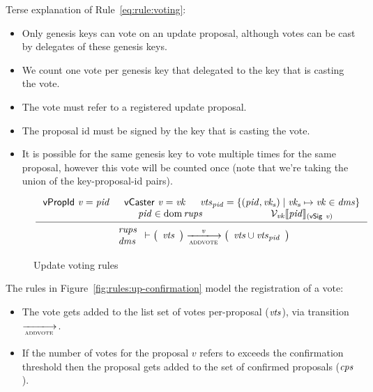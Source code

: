 Terse explanation of Rule~\ref{eq:rule:voting}:
\begin{itemize}
\item Only genesis keys can vote on an update proposal, although votes can be
  cast by delegates of these genesis keys.
\item We count one vote per genesis key that delegated to the key that is
  casting the vote.
\item The vote must refer to a registered update proposal.
\item The proposal id must be signed by the key that is casting the vote.
\item It is possible for the same genesis key to vote multiple times for
  the same proposal, however this vote will be counted once (note that we're
  taking the union of the key-proposal-id pairs).
\end{itemize}

\begin{figure}[htb]
  \begin{equation}
    \label{eq:rule:voting}
    \inference
    {
      \vPropId{v} = \var{pid} &  \vCaster{v} = \var{vk} &
      \var{vts}_{\var{pid}} =
      \{ (\var{pid}, \var{vk_s}) \mid \var{vk_s} \mapsto \var{vk} \in \var{dms} \}\\
      & \var{pid} \in \dom \var{rups} &
      \mathcal{V}_{\var{vk}}\serialised{\var{pid}}_{(\vSig{v})}\\
    }
    {
      {
        \begin{array}{l}
          \var{rups}\\
          \var{dms}
        \end{array}
      }
      \vdash
      {
        \left(
          \begin{array}{l}
            \var{vts}
          \end{array}
        \right)
      }
      \trans{addvote}{\var{v}}
      {
        \left(
          \begin{array}{l}
            \var{vts} \cup \var{vts}_{\var{pid}}\\
          \end{array}
        \right)
      }
    }
  \end{equation}
  \caption{Update voting rules}
  \label{fig:rules:voting}
\end{figure}

\clearpage

The rules in Figure~\ref{fig:rules:up-confirmation} model the registration of a vote:
\begin{itemize}
\item The vote gets added to the list set of votes per-proposal ($\mathit{vts}$),
  via transition $\trans{addvote}{}$.
\item If the number of votes for the proposal $v$ refers to exceeds the
  confirmation threshold then the proposal gets added to the set of confirmed
  proposals ($\mathit{cps}$).
\end{itemize}

